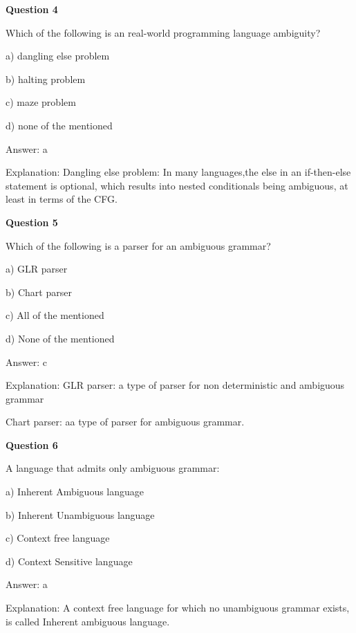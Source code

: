 \documentclass{article}
\begin{document}
\begin{mdframed}[linewidth=1pt, roundcorner=5pt, linecolor=gray!30, backgroundcolor=gray!5]
\textbf{Question 4} 

Which of the following is an real-world programming language ambiguity?

a) dangling else problem

b) halting problem

c) maze problem

d) none of the mentioned
\vspace{5pt} \par
\begin{tcolorbox}[colback=green!5, colframe=green!40!black, title=Solution]
Answer: a

Explanation: Dangling else problem: In many languages,the else in an if-then-else statement is optional, which results into nested conditionals being ambiguous, at least in terms of the CFG.
\end{tcolorbox}
\end{mdframed}

\begin{mdframed}[linewidth=1pt, roundcorner=5pt, linecolor=gray!30, backgroundcolor=gray!5]
\textbf{Question 5} 

Which of the following is a parser for an ambiguous grammar?

a) GLR parser

b) Chart parser

c) All of the mentioned

d) None of the mentioned
\vspace{5pt} \par
\begin{tcolorbox}[colback=green!5, colframe=green!40!black, title=Solution]
Answer: c

Explanation: GLR parser: a type of parser for non deterministic and ambiguous grammar

Chart parser: aa type of parser for ambiguous grammar.
\end{tcolorbox}
\end{mdframed}

\begin{mdframed}[linewidth=1pt, roundcorner=5pt, linecolor=gray!30, backgroundcolor=gray!5]
\textbf{Question 6} 

A language that admits only ambiguous grammar:

a) Inherent Ambiguous language

b) Inherent Unambiguous language

c) Context free language

d) Context Sensitive language
\vspace{5pt} \par
\begin{tcolorbox}[colback=green!5, colframe=green!40!black, title=Solution]
Answer: a

Explanation: A context free language for which no unambiguous grammar exists, is called Inherent ambiguous language.
\end{tcolorbox}
\end{mdframed}
\newpage
\end{document}
